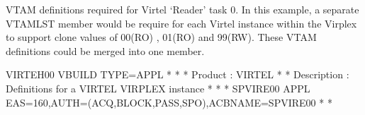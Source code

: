 \documentclass[letterpaper,10pt,english]{sphinxmanual}
\begin{document}
\ignorespaces 
\sphinxAtStartPar
{}

\sphinxAtStartPar
VTAM definitions required for Virtel ‘Reader’ task 0. In this example, a separate VTAMLST member would be require for each Virtel instance within the Virplex to support clone values of 00(RO) , 01(RO) and 99(RW). These VTAM definitions could be merged into one member.

\begin{sphinxVerbatim}[commandchars=\\\{\}]
VIRTEH00 VBUILD TYPE=APPL
* \PYGZhy{}\PYGZhy{}\PYGZhy{}\PYGZhy{}\PYGZhy{}\PYGZhy{}\PYGZhy{}\PYGZhy{}\PYGZhy{}\PYGZhy{}\PYGZhy{}\PYGZhy{}\PYGZhy{}\PYGZhy{}\PYGZhy{}\PYGZhy{}\PYGZhy{}\PYGZhy{}\PYGZhy{}\PYGZhy{}\PYGZhy{}\PYGZhy{}\PYGZhy{}\PYGZhy{}\PYGZhy{}\PYGZhy{}\PYGZhy{}\PYGZhy{}\PYGZhy{}\PYGZhy{}\PYGZhy{}\PYGZhy{}\PYGZhy{}\PYGZhy{}\PYGZhy{}\PYGZhy{}\PYGZhy{}\PYGZhy{}\PYGZhy{}\PYGZhy{}\PYGZhy{}\PYGZhy{}\PYGZhy{}\PYGZhy{}\PYGZhy{}\PYGZhy{}\PYGZhy{}\PYGZhy{}\PYGZhy{}\PYGZhy{}\PYGZhy{}\PYGZhy{}\PYGZhy{}\PYGZhy{}\PYGZhy{}\PYGZhy{}\PYGZhy{}\PYGZhy{}\PYGZhy{}\PYGZhy{}\PYGZhy{}\PYGZhy{}\PYGZhy{}\PYGZhy{}\PYGZhy{}\PYGZhy{} *
* Product     :  VIRTEL                                              *
* Description :  Definitions for a VIRTEL VIRPLEX instance           *
* \PYGZhy{}\PYGZhy{}\PYGZhy{}\PYGZhy{}\PYGZhy{}\PYGZhy{}\PYGZhy{}\PYGZhy{}\PYGZhy{}\PYGZhy{}\PYGZhy{}\PYGZhy{}\PYGZhy{}\PYGZhy{}\PYGZhy{}\PYGZhy{}\PYGZhy{}\PYGZhy{}\PYGZhy{}\PYGZhy{}\PYGZhy{}\PYGZhy{}\PYGZhy{}\PYGZhy{}\PYGZhy{}\PYGZhy{}\PYGZhy{}\PYGZhy{}\PYGZhy{}\PYGZhy{}\PYGZhy{}\PYGZhy{}\PYGZhy{}\PYGZhy{}\PYGZhy{}\PYGZhy{}\PYGZhy{}\PYGZhy{}\PYGZhy{}\PYGZhy{}\PYGZhy{}\PYGZhy{}\PYGZhy{}\PYGZhy{}\PYGZhy{}\PYGZhy{}\PYGZhy{}\PYGZhy{}\PYGZhy{}\PYGZhy{}\PYGZhy{}\PYGZhy{}\PYGZhy{}\PYGZhy{}\PYGZhy{}\PYGZhy{}\PYGZhy{}\PYGZhy{}\PYGZhy{}\PYGZhy{}\PYGZhy{}\PYGZhy{}\PYGZhy{}\PYGZhy{}\PYGZhy{}\PYGZhy{} *
SPVIRE00 APPL  EAS=160,AUTH=(ACQ,BLOCK,PASS,SPO),ACBNAME=SPVIRE00
* \PYGZhy{}\PYGZhy{}\PYGZhy{}\PYGZhy{}\PYGZhy{}\PYGZhy{}\PYGZhy{}\PYGZhy{}\PYGZhy{}\PYGZhy{}\PYGZhy{}\PYGZhy{}\PYGZhy{}\PYGZhy{}\PYGZhy{}\PYGZhy{}\PYGZhy{}\PYGZhy{}\PYGZhy{}\PYGZhy{}\PYGZhy{}\PYGZhy{}\PYGZhy{}\PYGZhy{}\PYGZhy{}\PYGZhy{}\PYGZhy{}\PYGZhy{}\PYGZhy{}\PYGZhy{}\PYGZhy{}\PYGZhy{}\PYGZhy{}\PYGZhy{}\PYGZhy{}\PYGZhy{}\PYGZhy{}\PYGZhy{}\PYGZhy{}\PYGZhy{}\PYGZhy{}\PYGZhy{}\PYGZhy{}\PYGZhy{}\PYGZhy{}\PYGZhy{}\PYGZhy{}\PYGZhy{}\PYGZhy{}\PYGZhy{}\PYGZhy{}\PYGZhy{}\PYGZhy{}\PYGZhy{}\PYGZhy{}\PYGZhy{}\PYGZhy{}\PYGZhy{}\PYGZhy{}\PYGZhy{}\PYGZhy{}\PYGZhy{}\PYGZhy{}\PYGZhy{}\PYGZhy{}\PYGZhy{} *

\end{sphinxVerbatim}
\end{document}
